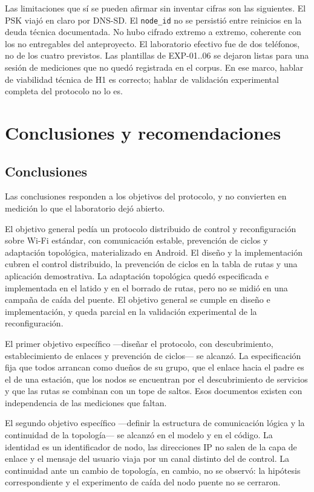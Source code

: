 \documentclass[12pt,oneside]{scrreprt}
\begin{document}
Las limitaciones que sí se pueden afirmar sin inventar cifras son las siguientes. El PSK viajó en claro por DNS-SD. El \texttt{node\_id} no se persistió entre reinicios en la deuda técnica documentada. No hubo cifrado extremo a extremo, coherente con los no entregables del anteproyecto. El laboratorio efectivo fue de dos teléfonos, no de los cuatro previstos. Las plantillas de EXP-01..06 se dejaron listas para una sesión de mediciones que no quedó registrada en el corpus. En ese marco, hablar de viabilidad técnica de H1 es correcto; hablar de validación experimental completa del protocolo no lo es.

\fi
\chapter{Conclusiones y recomendaciones}

\section{Conclusiones}
\label{ch:conclusiones}
Las conclusiones responden a los objetivos del protocolo, y no convierten en medición lo que el laboratorio dejó abierto.

El objetivo general pedía un protocolo distribuido de control y reconfiguración sobre Wi-Fi estándar, con comunicación estable, prevención de ciclos y adaptación topológica, materializado en Android. El diseño y la implementación cubren el control distribuido, la prevención de ciclos en la tabla de rutas y una aplicación demostrativa. La adaptación topológica quedó especificada e implementada en el latido y en el borrado de rutas, pero no se midió en una campaña de caída del puente. El objetivo general se cumple en diseño e implementación, y queda parcial en la validación experimental de la reconfiguración.

El primer objetivo específico ---diseñar el protocolo, con descubrimiento, establecimiento de enlaces y prevención de ciclos--- se alcanzó. La especificación fija que todos arrancan como dueños de su grupo, que el enlace hacia el padre es el de una estación, que los nodos se encuentran por el descubrimiento de servicios y que las rutas se combinan con un tope de saltos. Esos documentos existen con independencia de las mediciones que faltan.

El segundo objetivo específico ---definir la estructura de comunicación lógica y la continuidad de la topología--- se alcanzó en el modelo y en el código. La identidad es un identificador de nodo, las direcciones IP no salen de la capa de enlace y el mensaje del usuario viaja por un canal distinto del de control. La continuidad ante un cambio de topología, en cambio, no se observó: la hipótesis correspondiente y el experimento de caída del nodo puente no se cerraron.
\end{document}
